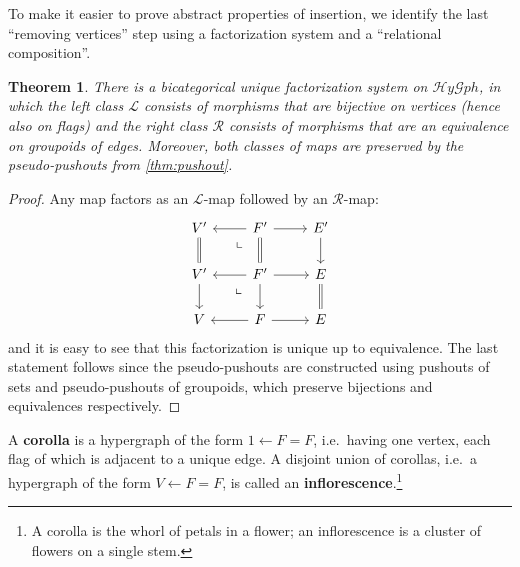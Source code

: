 \documentclass{article}
\newtheorem{thm}{Theorem}[section]
\theoremstyle{definition}
\theoremstyle{remark}
\def\L{\mathcal{L}}
\def\R{\mathcal{R}}
\newcommand{\dlpullback}[1][dl]{\ar[#1,phantom,near start,"\llcorner"]}
\let\ot\leftarrow
\def\hy{\mathcal{H}\mathit{y}\mathcal{G}\mathit{ph}}
\begin{document}
To make it easier to prove abstract properties of insertion, we identify the last ``removing vertices'' step using a factorization system and a ``relational composition''.

\begin{thm}
  There is a bicategorical unique factorization system on $\hy$, in which the left class $\L$ consists of morphisms that are bijective on vertices (hence also on flags) and the right class $\R$ consists of morphisms that are an equivalence on groupoids of edges.
  Moreover, both classes of maps are preserved by the pseudo-pushouts from \cref{thm:pushout}.
\end{thm}
\begin{proof}
  Any map factors as an $\L$-map followed by an $\R$-map:
  \[
  \begin{tikzcd}
    V' \ar[d,equals] & F' \ar[l] \ar[d,equals] \dlpullback \ar[r] & E' \ar[d] \\
    V' \ar[d] & F' \ar[l] \ar[d] \ar[r] \dlpullback & E \ar[d,equals]\\
    V & F \ar[l] \ar[r] & E
  \end{tikzcd}
  \]
  and it is easy to see that this factorization is unique up to equivalence.
  The last statement follows since the pseudo-pushouts are constructed using pushouts of sets and pseudo-pushouts of groupoids, which preserve bijections and equivalences respectively.
\end{proof}

A \textbf{corolla} is a hypergraph of the form $1 \ot F = F$, i.e.\ having one vertex, each flag of which is adjacent to a unique edge.
A disjoint union of corollas, i.e.\ a hypergraph of the form $V \ot F = F$, is called an \textbf{inflorescence}.\footnote{A corolla is the whorl of petals in a flower; an inflorescence is a cluster of flowers on a single stem.}
\end{document}
